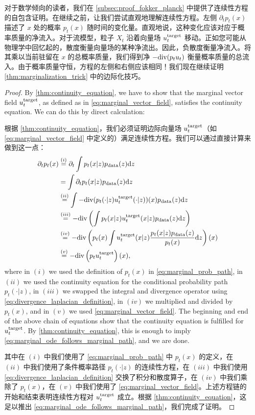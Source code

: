 对于数学倾向的读者，我们在 \cref{subsec:proof_fokker_planck} 中提供了连续性方程的自包含证明。在继续之前，让我们尝试直观地理解连续性方程。左侧 $\partial_tp_t(x)$ 描述了 $x$ 处的概率 $p_t(x)$ 随时间的变化量。直观地说，这种变化应该对应于概率质量的净流入。对于流模型，粒子 $X_t$ 沿着向量场 $u^{\text{target}}_t$ 移动。正如您可能从物理学中回忆起的，散度衡量向量场的某种净流出。因此，负散度衡量净流入。将其乘以当前驻留在 $x$ 的总概率质量，我们得到净 $-\mathrm{div} (p_tu_t)$ 衡量概率质量的总流入。由于概率质量守恒，方程的左侧和右侧应该相同！我们现在继续证明 \cref{thm:marginalization_trick} 中的边际化技巧。
\begin{proof}
By \cref{thm:continuity_equation}, we have to show that the marginal vector field $u^{\text{target}}_t$, as defined as in \cref{eq:marginal_vector_field}, satisfies the continuity equation. We can do this by direct calculation:

根据 \cref{thm:continuity_equation}，我们必须证明边际向量场 $u^{\text{target}}_t$（如 \cref{eq:marginal_vector_field} 中定义的）满足连续性方程。我们可以通过直接计算来做到这一点：
\begin{align*}
\partial_t p_t(x) &\overset{(i)}
{=} \partial_t\int p_t(x|z) p_{\rm{data}} (z) \mathrm{d} z\\
&= \int \partial_t p_t(x|z) p_{\rm{data}} (z) \mathrm{d} z\\
&\overset{(ii)}{=} \int -\mathrm{div} (p_t(\cdot|z)u^{\text{target}}_t(\cdot|z))(x) p_{\rm{data}} (z) \mathrm{d} z\\
&\overset{(iii)}{=} -\mathrm{div} \left(\int p_t(x|z) u^{\text{target}}_t(x|z)p_{\rm{data}}(z) \mathrm{d} z\right)\\
&\overset{(iv)}{=} -\mathrm{div} \left(p_t(x)\int u^{\text{target}}_t(x|z) \frac{p_t(x|z)p_{\rm{data}}(z)}{p_t(x)}\mathrm{d} z\right)(x)\\
&\overset{(v)}{=} -\mathrm{div} \left(p_tu^{\text{target}}_t\right)(x),
\end{align*}
where in $(i)$ we used the definition of $p_t(x)$ in \cref{eq:marginal_prob_path}, in $(ii)$ we used the continuity equation for the conditional probability path $p_t(\cdot|z)$, in $(iii)$ we swapped the integral and divergence operator using \cref{eq:divergence_laplacian_definition}, in $(iv)$ we multiplied and divided by $p_t(x)$, and in $(v)$ we used \cref{eq:marginal_vector_field}. The beginning and end of the above chain of equations show that the continuity equation is fulfilled for $u^{\text{target}}_t$. By \cref{thm:continuity_equation}, this is enough to imply \cref{eq:marginal_ode_follows_marginal_path}, and we are done.

其中在 $(i)$ 中我们使用了 \cref{eq:marginal_prob_path} 中 $p_t(x)$ 的定义，在 $(ii)$ 中我们使用了条件概率路径 $p_t(\cdot|z)$ 的连续性方程，在 $(iii)$ 中我们使用 \cref{eq:divergence_laplacian_definition} 交换了积分和散度算子，在 $(iv)$ 中我们乘除了 $p_t(x)$，在 $(v)$ 中我们使用了 \cref{eq:marginal_vector_field}。上述方程链的开始和结束表明连续性方程对 $u^{\text{target}}_t$ 成立。根据 \cref{thm:continuity_equation}，这足以推出 \cref{eq:marginal_ode_follows_marginal_path}，我们完成了证明。
\end{proof}


